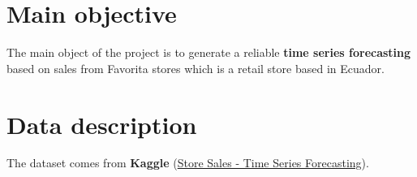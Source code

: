 \section[Main objective]{Main objective}
\label{sec:main_objective}

The main object of the project is to generate a reliable \textbf{time series forecasting} based on sales from Favorita stores which is a  retail store based in Ecuador.  

\clearpage

\section[Data description]{Data description}
\label{sec:data_description}

The dataset comes from \textbf{Kaggle} (\href{https://www.kaggle.com/competitions/store-sales-time-series-forecasting/data}{Store Sales - Time Series Forecasting}). 

